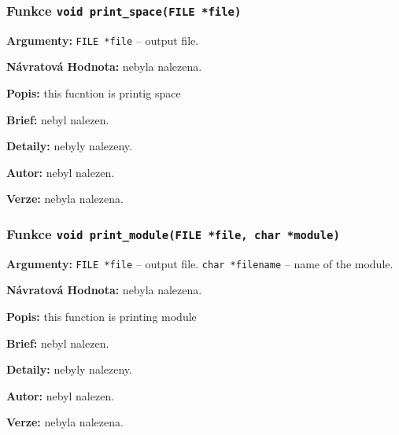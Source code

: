 \documentclass[12pt, a4paper]{article}
\begin{document}
\subsubsection{Funkce \texttt{void print\_space(FILE *file)}}
\textbf{Argumenty: }\verb"FILE *file" -- output file. \\
\par\noindent
\textbf{Návratová Hodnota: }nebyla nalezena.\\
\par\noindent
\textbf{Popis: }this fucntion is printig space\\
\par\noindent
\textbf{Brief: }nebyl nalezen.\\
\par\noindent
\textbf{Detaily: }nebyly nalezeny.\\
\par\noindent
\textbf{Autor: }nebyl nalezen.\\
\par\noindent
\textbf{Verze: }nebyla nalezena.\\
\par\noindent
\subsubsection{Funkce \texttt{void print\_module(FILE *file, char *module)}}
\textbf{Argumenty: }\verb"FILE *file" -- output file. \verb"char *filename" -- name of the module. \\
\par\noindent
\textbf{Návratová Hodnota: }nebyla nalezena.\\
\par\noindent
\textbf{Popis: }this function is printing module\\
\par\noindent
\textbf{Brief: }nebyl nalezen.\\
\par\noindent
\textbf{Detaily: }nebyly nalezeny.\\
\par\noindent
\textbf{Autor: }nebyl nalezen.\\
\par\noindent
\textbf{Verze: }nebyla nalezena.\\
\par\noindent
\end{document}
